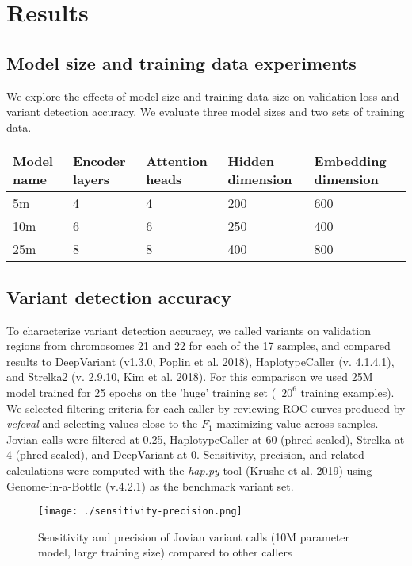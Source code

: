 \documentclass[]{article}
\begin{document}
\section{Results}

\subsection{Model size and training data experiments}

We explore the effects of model size and training data size on validation loss and variant detection accuracy. We evaluate three model sizes and two sets of training data.

\begin{center}
	\begin{tabular}{ lllll }
	 Model name & Encoder layers & Attention heads & Hidden dimension & Embedding dimension \\ 
	\hline
	 5m & 4 & 4 & 200 & 600 \\ 
	 10m & 6 & 6 & 250 & 400 \\ 
	 25m & 8 & 8 & 400 & 800 \\ 
	 \hline
	\end{tabular}
\end{center}





\subsection{Variant detection accuracy}

To characterize variant detection accuracy, we called variants on validation regions from chromosomes 21 and 22 for each of the 17 samples, and compared results to DeepVariant (v1.3.0, Poplin et al. 2018), HaplotypeCaller (v. 4.1.4.1), and Strelka2 (v. 2.9.10, Kim et al. 2018). For this comparison we used 25M model trained for 25 epochs on the 'huge' training set (~$20^6$ training examples). We selected filtering criteria for each caller by reviewing ROC curves produced by \textit{vcfeval} and selecting values close to the $F_1$ maximizing value across samples. Jovian calls were filtered at 0.25, HaplotypeCaller at 60 (phred-scaled), Strelka at 4 (phred-scaled), and DeepVariant at 0. Sensitivity, precision, and related calculations were computed with the \textit{hap.py} tool (Krushe et al. 2019) using Genome-in-a-Bottle (v.4.2.1) as the benchmark variant set. 

\begin{figure}[htp]
	\texttt{[image: ./sensitivity-precision.png]}
	\caption{ Sensitivity and precision of Jovian variant calls (10M parameter model, large training size) compared to other callers }
	\label{fig:sens-ppv}
\end{figure}
\end{document}

